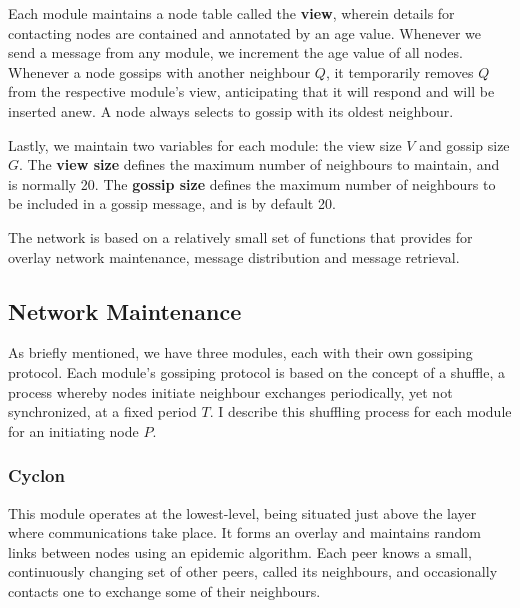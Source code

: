 \documentclass[10pt,a4paper,onecolumn]{article}
\begin{document}
Each module maintains a node table called the \textbf{view}, wherein details for contacting nodes are contained and annotated by an age value. Whenever we send a message from any module, we increment the age value of all nodes. Whenever a node gossips with another  neighbour $Q$, it temporarily removes $Q$ from the respective module’s view, anticipating that it will respond and will be inserted anew. A node always selects to gossip with its oldest neighbour.

Lastly, we maintain two variables for each module: the view size $V$ and gossip size $G$. The \textbf{view size} defines the maximum number of neighbours to maintain, and is normally 20. The \textbf{gossip size} defines the maximum number of neighbours to be included in a gossip message, and is by default 20.

The network is based on a relatively small set of functions that provides for overlay network maintenance, message distribution and message retrieval.

\subsection*{Network Maintenance}
As briefly mentioned, we have three modules, each with their own gossiping protocol. Each module's gossiping protocol is based on the concept of a shuffle, a process whereby nodes initiate neighbour exchanges periodically, yet not synchronized, at a fixed period $T$. I describe this shuffling process for each module for an initiating node $P$. 

\subsubsection*{Cyclon}
This module operates at the lowest-level, being situated just above the layer where communications take place. It forms an overlay and maintains random links between nodes using an epidemic algorithm. Each peer knows a small, continuously changing set of other peers, called its neighbours, and occasionally contacts one to exchange some of their neighbours.
\end{document}
